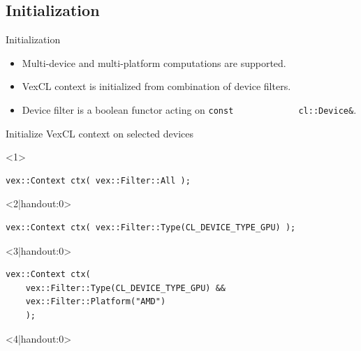 \documentclass[@BEAMER_OPTIONS@]{beamer}
\newcommand{\code}[1]{\lstinline|#1|}
\begin{document}
\begin{frame}{}
\end{frame}

\note{ }

\subsection{Initialization}

\begin{frame}[fragile]{Initialization}
    \begin{itemize}
        \item Multi-device and multi-platform computations are supported.
        \item VexCL context is initialized from combination of device filters.
        \item Device filter is a boolean functor acting on \code{const
            cl::Device&}.
    \end{itemize}
    \vspace{-0.5\baselineskip}
    \begin{overlayarea}{\textwidth}{0.4\textheight}
    \begin{exampleblock}{Initialize VexCL context on selected devices}
        \begin{onlyenv}<1>
        \begin{lstlisting}
vex::Context ctx( vex::Filter::All );
        \end{lstlisting}
        \end{onlyenv}
        \begin{onlyenv}<2|handout:0>
        \begin{lstlisting}
vex::Context ctx( vex::Filter::Type(CL_DEVICE_TYPE_GPU) );
        \end{lstlisting}
        \end{onlyenv}
        \begin{onlyenv}<3|handout:0>
        \begin{lstlisting}
vex::Context ctx(
    vex::Filter::Type(CL_DEVICE_TYPE_GPU) &&
    vex::Filter::Platform("AMD")
    );
        \end{lstlisting}
        \end{onlyenv}
        \begin{onlyenv}<4|handout:0>
        \begin{lstlisting}

\end{lstlisting}
\end{onlyenv}
\end{exampleblock}
\end{overlayarea}
\end{frame}
\end{document}
